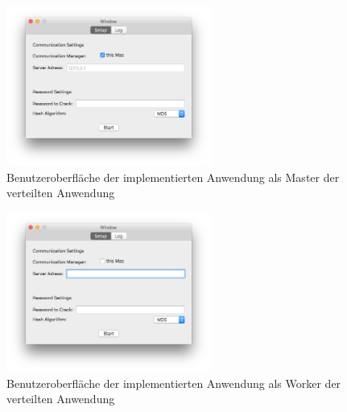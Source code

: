 \begin{figure}[!ht]
	\centering
		\includegraphics[natwidth=1200pt, natheight=349pt, width=0.6\textwidth]{images/WindowMaster.png}
		\caption{Benutzeroberfläche der implementierten Anwendung als Master der verteilten Anwendung}
	\label{fig:WindowMaster}
\end{figure}



\begin{figure}[!ht]
	\centering
		\includegraphics[natwidth=1200pt, natheight=349pt, width=0.6\textwidth]{images/WindowWorker.png}
		\caption{Benutzeroberfläche der implementierten Anwendung als Worker der verteilten Anwendung}
	\label{fig:WindowMaster}
\end{figure}

